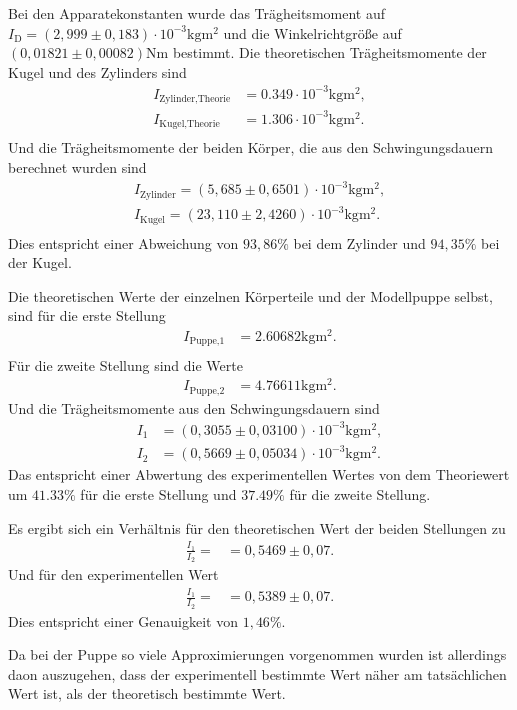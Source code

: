 Bei den Apparatekonstanten wurde das Trägheitsmoment auf \newline
$I_{\text{D}} = (2,999 \pm 0,183) \cdot 10^{-3} \si{\kilogram\meter^2}$ und die
Winkelrichtgröße auf $(0,01821\pm 0,00082) \si{\newton\meter}$ bestimmt.
Die theoretischen Trägheitsmomente der Kugel und des Zylinders sind
\begin{align*}
    I_{\text{Zylinder,Theorie}} &= 0.349 \cdot 10^{-3} \si{\kilogram\meter^2}, \\
    I_{\text{Kugel,Theorie}} &= 1.306 \cdot 10^{-3} \si{\kilogram\meter^2}. \\
\end{align*}
Und die Trägheitsmomente der beiden Körper, die aus den Schwingungsdauern berechnet wurden sind
\begin{align*}
    I_{\text{Zylinder}} = (5,685 \pm 0,6501) \cdot 10^{-3} \si{\kilogram\meter^2}, \\
    I_{\text{Kugel}} = (23,110 \pm 2,4260) \cdot 10^{-3} \si{\kilogram\meter^2}. \\
\end{align*}
Dies entspricht einer Abweichung von $93,86\%$ bei dem Zylinder und $94,35\%$ bei der Kugel.

Die theoretischen Werte der einzelnen Körperteile und der Modellpuppe selbst, sind für die erste Stellung
\begin{align*}
    I_{\text{Puppe,1}} &= 2.60682 \si{\kilogram\meter^2}. \\
\end{align*}
Für die zweite Stellung sind die Werte
\begin{align*}
    I_{\text{Puppe,2}} &= 4.76611 \si{\kilogram\meter^2}.
\end{align*}
Und die Trägheitsmomente aus den Schwingungsdauern sind
\begin{align*}
    I_{1} &= (0,3055\pm 0,03100) \cdot 10^{-3} \si{\kilogram\meter^2}, \\
    I_{2} &= (0,5669\pm 0,05034) \cdot 10^{-3} \si{\kilogram\meter^2}.
\end{align*}
Das entspricht einer Abwertung des experimentellen Wertes von dem Theoriewert um $41.33 \%$ für die erste Stellung und
$37.49 \%$ für die zweite Stellung.

Es ergibt sich ein Verhältnis für den theoretischen Wert der beiden Stellungen zu
\begin{align}
    \frac{I_1}{I_2} = &= 0,5469\pm 0,07.
\end{align}
Und für den experimentellen Wert
\begin{align*}
    \frac{I_1}{I_2} = &= 0,5389\pm 0,07.
\end{align*}
Dies entspricht einer Genauigkeit von $1,46\%$.

Da bei der Puppe so viele Approximierungen vorgenommen wurden ist allerdings daon auszugehen, dass der experimentell bestimmte Wert näher am 
tatsächlichen Wert ist, als der theoretisch bestimmte Wert.